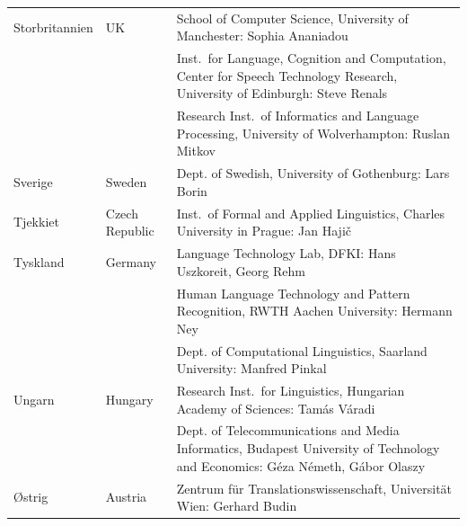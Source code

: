 \begin{longtable}{llp{113mm}}
  Storbritannien & \textcolor{grey1}{UK} & School of Computer Science, University of Manchester: Sophia Ananiadou \\ \addlinespace 
  & & Inst.~for Language, Cognition and Computation, Center for Speech Technology Research, University of Edinburgh: Steve Renals \\ \addlinespace 
  & & Research Inst.~of Informatics and Language Processing, University of Wolverhampton: Ruslan Mitkov \\ \addlinespace
   
Sverige & \textcolor{grey1}{Sweden} & Dept. of Swedish, University of Gothenburg: Lars Borin \\ \addlinespace

  Tjekkiet & \textcolor{grey1}{Czech Republic} & Inst.~of Formal and Applied Linguistics, Charles University in Prague: Jan Hajič \\ \addlinespace
  
 Tyskland & \textcolor{grey1}{Germany} & Language Technology Lab, DFKI: Hans Uszkoreit, Georg Rehm\\ \addlinespace
  & & Human Language Technology and Pattern Recognition, RWTH Aachen University: Hermann Ney \\ \addlinespace
  & & Dept. of Computational Linguistics, Saarland University: Manfred Pinkal\\ \addlinespace 
  
  Ungarn & \textcolor{grey1}{Hungary} & Research Inst.~for Linguistics, Hungarian Academy of Sciences: Tamás Váradi\\  \addlinespace
  & & Dept. of Telecommunications and Media Informatics, Budapest University of Technology and Economics: Géza Németh, Gábor Olaszy\\ \addlinespace
  
  \O strig & \textcolor{grey1}{Austria} & Zentrum für Translationswissenschaft, Universität Wien: Gerhard Budin
\end{longtable}
\normalsize

\renewcommand*{\figureformat}{}
\renewcommand*{\captionformat}{}

